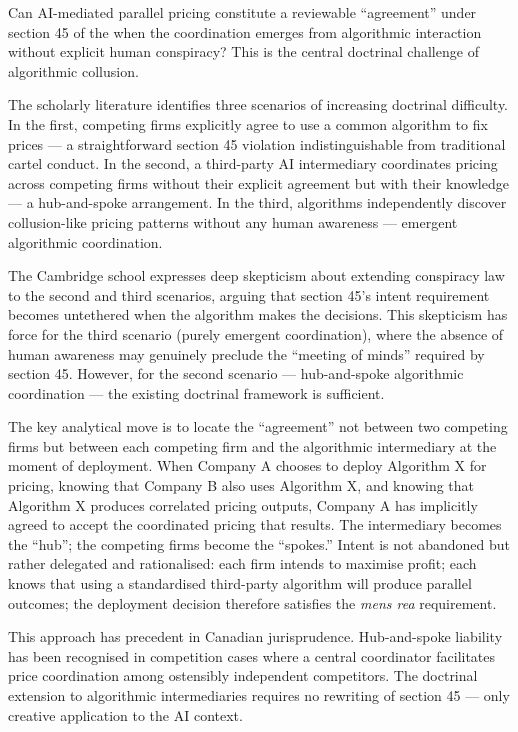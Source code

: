 Can AI-mediated parallel pricing constitute a reviewable ``agreement'' under section 45 of the  when the coordination emerges from algorithmic interaction without explicit human conspiracy? This is the central doctrinal challenge of algorithmic collusion.

The scholarly literature identifies three scenarios of increasing doctrinal difficulty. In the first, competing firms explicitly agree to use a common algorithm to fix prices --- a straightforward section 45 violation indistinguishable from traditional cartel conduct. In the second, a third-party AI intermediary coordinates pricing across competing firms without their explicit agreement but with their knowledge --- a hub-and-spoke arrangement. In the third, algorithms independently discover collusion-like pricing patterns without any human awareness --- emergent algorithmic coordination.

The Cambridge school expresses deep skepticism about extending conspiracy law to the second and third scenarios, arguing that section 45's intent requirement becomes untethered when the algorithm makes the decisions. This skepticism has force for the third scenario (purely emergent coordination), where the absence of human awareness may genuinely preclude the ``meeting of minds'' required by section 45. However, for the second scenario --- hub-and-spoke algorithmic coordination --- the existing doctrinal framework is sufficient.

The key analytical move is to locate the ``agreement'' not between two competing firms but between each competing firm and the algorithmic intermediary at the moment of deployment. When Company A chooses to deploy Algorithm X for pricing, knowing that Company B also uses Algorithm X, and knowing that Algorithm X produces correlated pricing outputs, Company A has implicitly agreed to accept the coordinated pricing that results. The intermediary becomes the ``hub''; the competing firms become the ``spokes.'' Intent is not abandoned but rather delegated and rationalised: each firm intends to maximise profit; each knows that using a standardised third-party algorithm will produce parallel outcomes; the deployment decision therefore satisfies the \textit{mens rea} requirement.

This approach has precedent in Canadian jurisprudence. Hub-and-spoke liability has been recognised in competition cases where a central coordinator facilitates price coordination among ostensibly independent competitors. The doctrinal extension to algorithmic intermediaries requires no rewriting of section 45 --- only creative application to the AI context.

